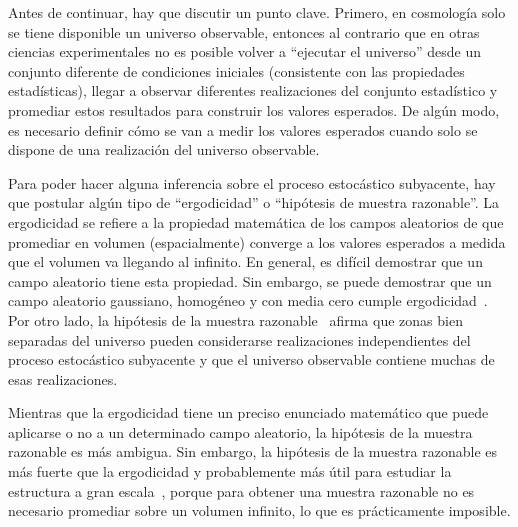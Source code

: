 Antes de continuar, hay que discutir un punto clave. Primero, en cosmología solo se tiene disponible un universo observable, entonces al contrario que en otras ciencias experimentales no es posible volver a ``ejecutar el universo'' desde un conjunto diferente de condiciones iniciales (consistente con las propiedades estadísticas), llegar a observar diferentes realizaciones del conjunto estadístico y promediar estos resultados para construir los valores esperados. De algún modo, es necesario definir cómo se van a medir los valores esperados cuando solo se dispone de una realización del universo observable.

Para poder hacer alguna inferencia sobre el proceso estocástico subyacente, hay que postular algún tipo de ``ergodicidad'' o ``hipótesis de muestra razonable''. La ergodicidad se refiere a la propiedad matemática de los campos aleatorios de que promediar en volumen (espacialmente) converge a los valores esperados a medida que el volumen va llegando al infinito. En general, es difícil demostrar que un campo aleatorio tiene esta propiedad. Sin embargo, se puede demostrar que un campo aleatorio gaussiano, homogéneo y con media cero cumple ergodicidad~\cite{adler1981}. Por otro lado, la hipótesis de la muestra razonable~\cite{peebles1980large} afirma que zonas bien separadas del universo pueden considerarse realizaciones independientes del proceso estocástico subyacente y que el universo observable contiene muchas de esas realizaciones.

Mientras que la ergodicidad tiene un preciso enunciado matemático que puede aplicarse o no a un determinado campo aleatorio, la hipótesis de la muestra razonable es más ambigua. Sin embargo, la hipótesis de la muestra razonable es más fuerte que la ergodicidad y probablemente más útil para estudiar la estructura a gran escala~\cite{watts2003statistical}, porque para obtener una muestra razonable no es necesario promediar sobre un volumen infinito, lo que es prácticamente imposible.
